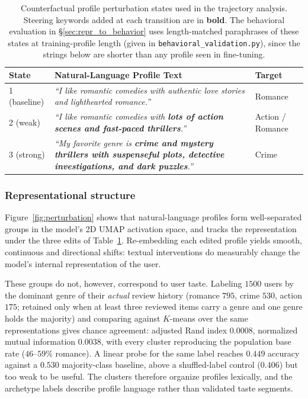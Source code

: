 \begin{table}[t]
    \centering
    \small
    \caption{Counterfactual profile perturbation states used in the trajectory analysis. Steering keywords added at each transition are in \textbf{bold}. The behavioral evaluation in \S\ref{sec:repr_to_behavior} uses length-matched paraphrases of these states at training-profile length (given in \texttt{behavioral\_validation.py}), since the strings below are shorter than any profile seen in fine-tuning.}
    \label{tab:profile_perturbations}
    \begin{tabular}{@{}lp{4.3cm}l@{}}
    \toprule
    \textbf{State} & \textbf{Natural-Language Profile Text} & \textbf{Target} \\
    \midrule
    1 (baseline) & \textit{``I like romantic comedies with authentic love stories and lighthearted romance.''} & Romance \\
    2 (weak)     & \textit{``I like romantic comedies with \textbf{lots of action scenes and fast-paced thrillers}.''} & Action / Romance \\
    3 (strong)   & \textit{``My favorite genre is \textbf{crime and mystery thrillers with suspenseful plots, detective investigations, and dark puzzles}.''} & Crime \\
    \bottomrule
    \end{tabular}
\end{table}

\subsubsection{Representational structure}
\label{sec:repr_structure}

Figure~\ref{fig:perturbation} shows that natural-language profiles form well-separated groups in the model's 2D UMAP activation space, and tracks the representation under the three edits of Table~\ref{tab:profile_perturbations}. Re-embedding each edited profile yields smooth, continuous and directional shifts: textual interventions do measurably change the model's internal representation of the user.

These groups do not, however, correspond to user taste. Labeling $1500$ users by the dominant genre of their \emph{actual} review history (romance $795$, crime $530$, action $175$; retained only when at least three reviewed items carry a genre and one genre holds the majority) and comparing against $K$-means over the same representations gives chance agreement: adjusted Rand index $0.0008$, normalized mutual information $0.0038$, with every cluster reproducing the population base rate ($46$--$59\%$ romance). A linear probe for the same label reaches $0.449$ accuracy against a $0.530$ majority-class baseline, above a shuffled-label control ($0.406$) but too weak to be useful. The clusters therefore organize profiles lexically, and the archetype labels describe profile language rather than validated taste segments.

